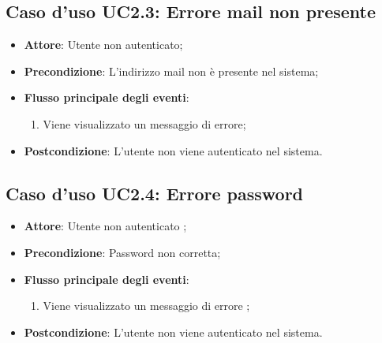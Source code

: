 \documentclass[12pt,a4paper]{article}
\begin{document}
\subsection{Caso d'uso UC2.3: Errore mail non presente}

\begin{itemize}

\item \textbf{Attore}: Utente non autenticato; 
\item \textbf{Precondizione}: L'indirizzo mail non è presente nel sistema;

\item \textbf{Flusso principale degli eventi}:
\begin{enumerate}
	\item Viene visualizzato un messaggio di errore;
	
\end{enumerate}
\item \textbf{Postcondizione}: L'utente non viene autenticato nel sistema.
\end{itemize}
\hypertarget{UC2.4}{}
\subsection{Caso d'uso UC2.4: Errore password}

\begin{itemize}

\item \textbf{Attore}: Utente non autenticato
; 
\item \textbf{Precondizione}: Password non corretta;

\item \textbf{Flusso principale degli eventi}:
\begin{enumerate}
	\item Viene visualizzato un messaggio di errore	;
	
\end{enumerate}
\item \textbf{Postcondizione}: L'utente non viene autenticato nel sistema.
\end{itemize}
\hypertarget{UC3}{}
\end{document}
